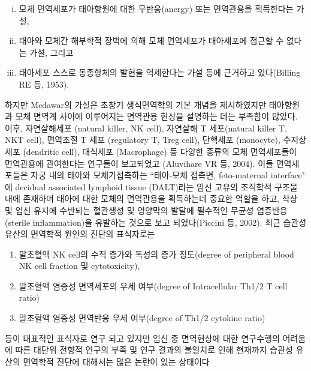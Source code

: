 \begin{enumerate}
	\begin{enumerate}[i)]\tightlist
	\item 모체 면역세포가 태아항원에 대한 무반응(anergy) 또는 면역관용을 획득한다는 가설,
	\item 태아와 모체간 해부학적 장벽에 의해 모체 면역세포가 태아세포에 접근할 수 없다는 가설, 그리고
	\item 태아세포 스스로 동종항체의 발현을 억제한다는 가설 등에 근거하고 있다(Billing RE 등, 1953).
	\end{enumerate}
하지만 Medawar의 가설은 초창기 생식면역학의 기본 개념을 제시하였지만 태아항원과 모체 면역계 사이에 이루어지는 면역관용 현상을 설명하는 데는 부족함이 많았다. 이후, 자연살해세포 (natural killer, NK cell), 자연살해 T 세포(natural killer T, NKT cell), 면역조절 T 세포
(regulatory T, Treg cell), 단핵세포 (monocyte), 수지상세포 (dendritic cell), 대식세포 (Macrophage) 등 다양한 종류의 모체 면역세포들이 면역관용에 관여한다는 연구들이 보고되었고 (Aluvihare VR 등, 2004). 이들 면역세포들은 자궁 내의 태아와 모체가접촉하는 ``태아-모체 접촉면, feto-maternal interface" 에 decidual associated lymphoid tissue (DALT)라는 임신 고유의 조직학적 구조물 내에 존재하며 태아에 대한 모체의 면역관용을 획득하는데 중요한 역할을 하고, 착상 및 임신 유지에 수반되는 혈관생성 및 영양막의 발달에 필수적인 무균성 염증반응 (sterile inflammation)을 유발하는 것으로 보고 되었다(Piccini 등, 2002). 최근 습관성 유산의 면역학적 원인의 진단의 표식자로는
	\begin{enumerate}[ⅰ)]\tightlist
	\item 말초혈액 NK cell의 수적 증가와 독성의 증가 정도(degree of peripheral blood NK cell fraction 및 cytotoxicity),
	\item 말초혈액 염증성 면역세포의 우세 여부(degree of Intracellular Th1/2 T cell ratio)
	\item 말초혈액 염증성 면역반응 우세 여부(degree of Th1/2 cytokine ratio)
	\end{enumerate}
등이 대표적인 표식자로 연구 되고 있지만 임신 중 면역현상에 대한 연구수행의 어려움에 따른 대단위 전향적 연구의 부족 및 연구 결과의 불일치로 인해 현재까지 습관성 유산의 면역학적 진단에 대해서는 많은 논란이 있는 상태이다
\end{enumerate}